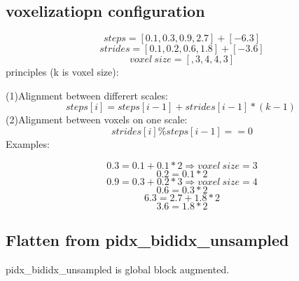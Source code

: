 \documentclass[,table,dvipsnames]{article}
\begin{document}
\subsection{voxelizatiopn configuration}
$$ steps = [0.1,0.3,0.9,2.7] + [-6.3]$$
$$ strides = [0.1,0.2,0.6,1.8] + [-3.6] $$
$$ voxel\ size=[, 3, 4, 4, 3] $$
principles (k is voxel size):

\noindent
(1)Alignment between differert scales:
$$ steps[i] = steps[i-1]+strides[i-1]*(k-1)\   $$
(2)Alignment between voxels on one scale:
$$ strides[i] \% steps[i-1] == 0 $$
Examples:\par
$$ 0.3=0.1+0.1*2 \Rightarrow voxel\ size=3 $$
$$ 0.2=0.1*2 $$
$$ 0.9=0.3+0.2*3 \Rightarrow voxel\ size=4 $$ 
$$ 0.6=0.3*2 $$
$$$$
$$ 6.3=2.7+1.8*2 $$
$$ 3.6=1.8*2 $$

\subsection{Flatten from pidx\_bididx\_unsampled}
pidx\_bididx\_unsampled is global block augmented.
\end{document}
